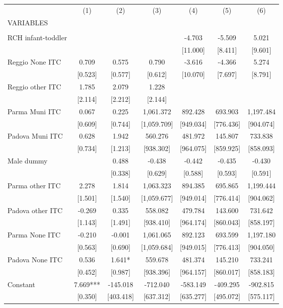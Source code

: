 \begin{tabular}{lcccccc} \hline
 & (1) & (2) & (3) & (4) & (5) & (6) \\
VARIABLES &  &  &  &  &  &  \\ \hline
 &  &  &  &  &  &  \\
RCH infant-toddler &  &  &  & -4.703 & -5.509 & 5.021 \\
 &  &  &  & [11.000] & [8.411] & [9.601] \\
Reggio None ITC & 0.709 & 0.575 & 0.790 & -3.616 & -4.366 & 5.274 \\
 & [0.523] & [0.577] & [0.612] & [10.070] & [7.697] & [8.791] \\
Reggio other ITC & 1.785 & 2.079 & 1.228 &  &  &  \\
 & [2.114] & [2.212] & [2.144] &  &  &  \\
Parma Muni ITC & 0.067 & 0.225 & 1,061.372 & 892.428 & 693.903 & 1,197.484 \\
 & [0.609] & [0.744] & [1,059.709] & [949.034] & [776.436] & [904.074] \\
Padova Muni ITC & 0.628 & 1.942 & 560.276 & 481.972 & 145.807 & 733.838 \\
 & [0.734] & [1.213] & [938.302] & [964.075] & [859.925] & [858.093] \\
Male dummy &  & 0.488 & -0.438 & -0.442 & -0.435 & -0.430 \\
 &  & [0.338] & [0.629] & [0.588] & [0.593] & [0.591] \\
Parma other ITC & 2.278 & 1.814 & 1,063.323 & 894.385 & 695.865 & 1,199.444 \\
 & [1.501] & [1.540] & [1,059.677] & [949.014] & [776.414] & [904.062] \\
Padova other ITC & -0.269 & 0.335 & 558.082 & 479.784 & 143.600 & 731.642 \\
 & [1.143] & [1.491] & [938.410] & [964.174] & [860.043] & [858.197] \\
Parma None ITC & -0.210 & -0.001 & 1,061.065 & 892.123 & 693.599 & 1,197.180 \\
 & [0.563] & [0.690] & [1,059.684] & [949.015] & [776.413] & [904.050] \\
Padova None ITC & 0.536 & 1.641* & 559.678 & 481.374 & 145.210 & 733.241 \\
 & [0.452] & [0.987] & [938.396] & [964.157] & [860.017] & [858.183] \\
Constant & 7.669*** & -145.018 & -712.040 & -583.149 & -409.295 & -902.815 \\
 & [0.350] & [403.418] & [637.312] & [635.277] & [495.072] & [575.117] \\

\end{tabular}
